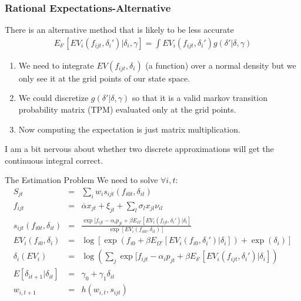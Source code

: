 \documentclass[xcolor=pdftex,dvipsnames,table,mathserif,aspectratio=169]{beamer}
\begin{document}
\begin{frame}
\frametitle{Rational Expectations-Alternative}
There is an alternative method that is likely to be less accurate
\begin{eqnarray*}
E_{\delta'}[ E V_i (f_{ijt}, \delta_i') |\delta_i, \gamma ]= \int EV_i(f_{ijt},\delta_{i}') g(\delta' | \delta, \gamma)
\end{eqnarray*}
\begin{enumerate}
\item We need to integrate $EV(f_{ijt},\delta_i)$ (a function) over a normal density but we only see it at the grid points of our state space.
\item We could \alert{discretize $g(\delta' | \delta,\gamma)$} so that it is a valid markov transition probability matrix (TPM) evaluated only at the grid points.
\item Now computing the expectation is just matrix multiplication.
\end{enumerate}
I am a bit nervous about whether two discrete approximations will get the continuous integral correct.
\end{frame}

\begin{frame}{The Estimation Problem}
We need to solve $\forall i, t $:
\begin{eqnarray*}
S_{jt} &=& \sum_i w_i s_{ijt}(f_{i0t},\delta_{it})\\
f_{ijt} &=& \overline{\alpha} x_{jt} + \xi_{jt} + \sum_l \sigma_l x_{jl} \nu_{il} \\
s_{ijt}(f_{i0t},\delta_{it}) &=& \frac{\exp[f_{ijt} - \alpha_i p_{jt} + \beta E_{\Omega'}[ EV_i (f_{ijt}, \delta_i') |\delta_i] }{\exp [EV_i(f_{i0t},\delta_{it}) ]}\\
EV_i(f_{i0}, \delta_i) &=& \log\left[ \exp( f_{i0} + \beta E_{\Omega'}[ EV_i (f_{i0}, \delta_i') |\delta_i] )+ \exp(\delta_i)  \right]\\
\delta_{i}(EV_i) &=& \log \left( \sum_j \exp[ f_{ijt}  -\alpha_i p_{jt} + \beta E_{\delta'}[ E V_i (f_{ijt}, \delta_i') |\delta_i ]  \right)\\
E[\delta_{it+1} | \delta_{it}] &=& \gamma_0 + \gamma_1 \delta_{it}\\
w_{i,t+1} &=&h(w_{i,t},s_{ijt})\\
\end{eqnarray*}
\end{frame}
\end{document}
